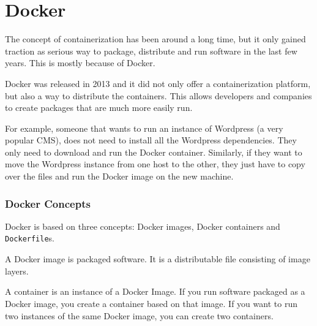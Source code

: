 \section{Docker}

\hfill

The concept of containerization has been around a long time, but it only gained traction as serious way to package, distribute and run software in the last few years. This is mostly because of Docker.

\hfill

Docker was released in 2013 and it did not only offer a containerization platform, but also a way to distribute the containers. This allows developers and companies to create packages that are much more easily run.

\hfill

For example, someone that wants to run an instance of Wordpress (a very popular CMS), does not need to install all the Wordpress dependencies. They only need to download and run the Docker container.
Similarly, if they want to move the Wordpress instance from one host to the other, they just have to copy over the files and run the Docker image on the new machine.

\subsubsection{Docker Concepts}
Docker is based on three concepts: Docker images, Docker containers and \lstinline{Dockerfile}s.

\hfill

A Docker image is packaged software. It is a distributable file consisting of image layers.

\hfill

A container is an instance of a Docker Image. If you run software packaged as a Docker image, you create a container based on that image. If you want to run two instances of the same Docker image, you can create two containers.

\hfill

